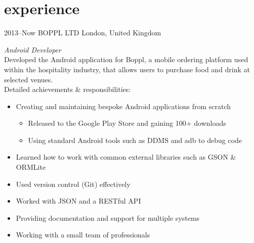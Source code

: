 \documentclass[]{friggeri-cv} %
\begin{document}

\section{experience}

\begin{entrylist}
\entry
{2013--Now}
{BOPPL LTD}
{London, United Kingdom}
{\emph{Android Developer} \\
Developed the Android application for Boppl, a mobile ordering platform used within the hospitality industry, that allows users to purchase food and drink at selected venues. \\
Detailed achievements \& responsibilities:
\begin{itemize}
\item Creating and maintaining bespoke Android applications from scratch
\begin{itemize}
\item Released to the Google Play Store and gaining 100+ downloads
\item Using standard Android tools such as DDMS and adb to debug code
\end{itemize}
\item Learned how to work with common external libraries such as GSON \& ORMLite
\item Used version control (Git) effectively
\item Worked with JSON and a RESTful API
\item Providing documentation and support for multiple systems
\item Working with a small team of professionals
%

\end{itemize}}
\end{entrylist}
\end{document}

